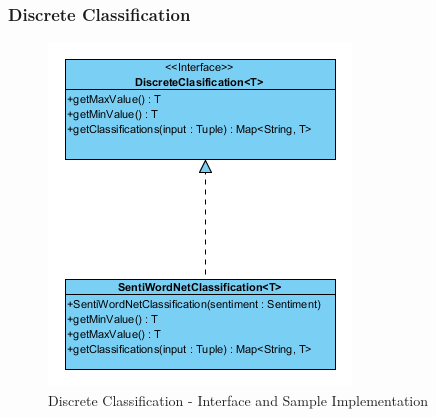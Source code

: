 \documentclass[a4paper]{article}
\begin{document}
\subsubsection{Discrete Classification}
\begin{figure}[h!]
	\centering
	\includegraphics[scale=2.5]{images/uml_discrete.png}
	\caption{Discrete Classification - Interface and Sample Implementation}
	\label{uml_fuzzy}
\end{figure}
\end{document}
